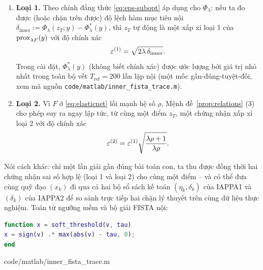 \begin{essayonly}
\begin{enumerate}[leftmargin=1.6em]
  \item \textbf{Loại 1.} Theo chính đẳng thức
  \eqref{eq:eps-subopt} áp dụng cho $\Phi_\lambda$: nếu ta đo được (hoặc
  chặn trên được) độ lệch hàm mục tiêu nội
  $\delta_{\text{inner}} := \Phi_\lambda(z_T;y)-\Phi_\lambda^*(y)$, thì
  $z_T$ {tự động} là một xấp xỉ loại 1 của $\operatorname{prox}_{\lambda F}(y)$
  với độ chính xác
  \[
    \varepsilon^{(1)} = \sqrt{2\lambda\,\delta_{\text{inner}}}.
  \]
  Trong cài đặt, $\Phi_\lambda^*(y)$ (không biết chính xác) được ước lượng bởi giá trị nhỏ nhất trong toàn bộ vết $T_{\text{ref}}=200$
  lần lặp nội (một mốc gần-đúng-tuyệt-đối, xem mã nguồn
  \texttt{code/matlab/\allowbreak inner\_fista\_\allowbreak trace.m}).
  \item \textbf{Loại 2.} Vì $F$ ở \eqref{eq:elasticnet} lồi
  mạnh hệ số $\rho$, Mệnh đề~\ref{prop:relations} (3) cho phép suy ra {ngay lập tức}, từ cùng một điểm $z_T$, một chứng nhận xấp xỉ loại 2 với độ chính xác
  \[
    \varepsilon^{(2)} = \varepsilon^{(1)}\sqrt{\frac{\lambda\rho+1}{\lambda\rho}}.
  \]
\end{enumerate}

Nói cách khác: {chỉ một} lần giải gần đúng bài toán con, ta thu được đồng thời hai chứng nhận sai số hợp lệ (loại 1 và loại 2) cho cùng một điểm -- và có thể đưa cùng quỹ đạo $(x_k)$ đi qua cả hai bộ sổ sách kế toán $(\eta_k,\delta_k)$ của IAPPA1 và $(\delta_k)$ của IAPPA2 để so sánh trực tiếp hai chặn lý thuyết trên cùng dữ liệu thực nghiệm.
Toán tử ngưỡng mềm và bộ giải FISTA nội:

\begin{lstlisting}[language=Matlab, caption={Toán tử prox của $\ell_1$ (tệp \texttt{soft\_threshold.m}).}]
function x = soft_threshold(v, tau)
x = sign(v) .* max(abs(v) - tau, 0);
end
\end{lstlisting}


  {code/matlab/inner_fista_trace.m}


\end{essayonly}
